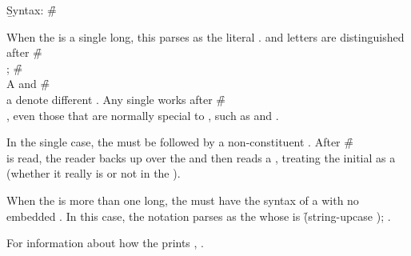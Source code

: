 

\b{Syntax:} \f{\#\\}


When the   is a single  long, 
this parses as the literal  .
 and  letters are distinguished after \f{\#\\};
\f{\#\\A} and \f{\#\\a} denote different  .
Any single  works after \f{\#\\},
even those that are normally special to , 
such as  and .

In the single  case,
the  must be followed by a non-constituent .
After \f{\#\\} is read,
the reader backs up over the  and then reads a ,
treating the initial  as a  
(whether it really is or not in the ).


When the   is more than one  long,
the  must have the syntax of a  
with no embedded .
In this case, the   notation
parses as the  whose  is \f{(string-upcase )};
\seesection\CharacterNames.


For information about how the  prints  ,
\seesection\PrintingCharacters.

